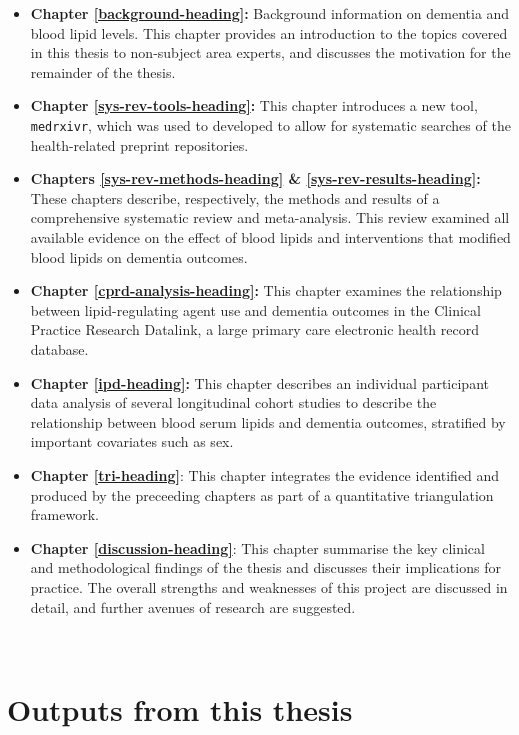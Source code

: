 \documentclass[a4paper, twoside]{templates/ociamthesis}
\providecommand{\tightlist}{%
  \setlength{\itemsep}{0pt}\setlength{\parskip}{0pt}}
\begin{document}
\begin{itemize}
\tightlist
\item
  \textbf{Chapter \ref{background-heading}:} Background information on dementia and blood lipid levels. This chapter provides an introduction to the topics covered in this thesis to non-subject area experts, and discusses the motivation for the remainder of the thesis.
\item
  \textbf{Chapter \ref{sys-rev-tools-heading}:} This chapter introduces a new tool, \texttt{medrxivr}, which was used to developed to allow for systematic searches of the health-related preprint repositories.
\item
  \textbf{Chapters \ref{sys-rev-methods-heading} \& \ref{sys-rev-results-heading}:} These chapters describe, respectively, the methods and results of a comprehensive systematic review and meta-analysis. This review examined all available evidence on the effect of blood lipids and interventions that modified blood lipids on dementia outcomes.
\item
  \textbf{Chapter \ref{cprd-analysis-heading}:} This chapter examines the relationship between lipid-regulating agent use and dementia outcomes in the Clinical Practice Research Datalink, a large primary care electronic health record database.
\item
  \textbf{Chapter \ref{ipd-heading}:} This chapter describes an individual participant data analysis of several longitudinal cohort studies to describe the relationship between blood serum lipids and dementia outcomes, stratified by important covariates such as sex.
\item
  \textbf{Chapter \ref{tri-heading}}: This chapter integrates the evidence identified and produced by the preceeding chapters as part of a quantitative triangulation framework.
\item
  \textbf{Chapter \ref{discussion-heading}}: This chapter summarise the key clinical and methodological findings of the thesis and discusses their implications for practice. The overall strengths and weaknesses of this project are discussed in detail, and further avenues of research are suggested.
\end{itemize}

~

\hypertarget{thesis-output}{%
\section{Outputs from this thesis}\label{thesis-output}}
\end{document}
